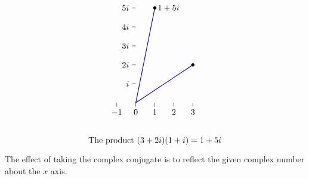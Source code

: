 \begin{equation*}
\begin{tikzpicture}[scale=0.8]
\begin{scope}[xshift=14cm]
      \draw(0,1) -- +(-0.2,0) node[left] {$i$};
      \draw(0,2) -- +(-0.2,0) node[left] {$2i$};
      \draw(0,3) -- +(-0.2,0) node[left] {$3i$};
      \draw(0,4) -- +(-0.2,0) node[left] {$4i$};
      \draw(0,5) -- +(-0.2,0) node[left] {$5i$};
      \draw(-1,0) -- +(0,-0.2) node[below] {$-1$};
      \draw(0,0) -- +(0,-0.2) node[below] {$0$};
      \draw(1,0) -- +(0,-0.2) node[below] {$1$};
      \draw(2,0) -- +(0,-0.2) node[below] {$2$};
      \draw(3,0) -- +(0,-0.2) node[below] {$3$};
      \draw[thick, blue] (0,0) -- (3,2);
      \draw[fill, black] (3,2) circle [radius=2.25pt];
      \draw[thick, blue] (0,0) -- (1,5);
      \draw[fill, black] (1,5) circle [radius=2.25pt] node [right] {$1+5i$};
      \draw (1,-2) node {The product $(3+2i)(1+i)=1+5i$};
    \end{scope}
  \end{tikzpicture}
\end{equation*}
The effect of taking the complex conjugate is to reflect the given
complex number about the $x$ axis.
